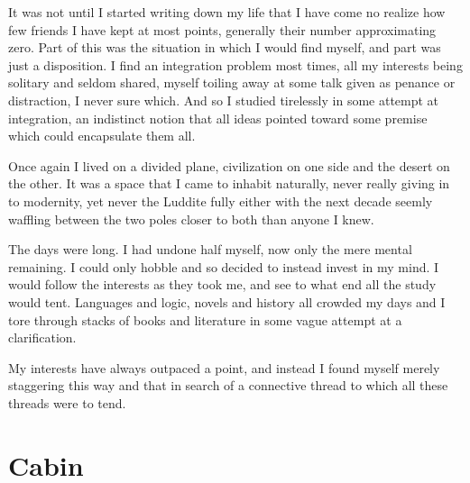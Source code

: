 \documentclass[ebook, 10pt, openright, onecolumn]{memoir}
\begin{document}
It was not until I started writing down my life that I have come no realize how
few friends I have kept at most points, generally their number approximating
zero.  Part of this was the situation in which I would find myself, and part was
just a disposition.  I find an integration problem most times, all my interests
being solitary and seldom shared, myself toiling away at some talk given as
penance or distraction, I never sure which.  And so I studied tirelessly in some
attempt at integration, an indistinct notion that all ideas pointed toward some
premise which could encapsulate them all. 

Once again I lived on a divided plane, civilization on one side and the desert
on the other.  It was a space that I came to inhabit naturally, never really
giving in to modernity, yet never the Luddite fully either with the next decade
seemly waffling between the two poles closer to both than anyone I knew.  

The days were long.  I had undone half myself, now only the mere mental
remaining.  I could only hobble and so decided to instead invest in my mind.  I
would follow the interests as they took me, and see to what end all the study
would tent.  Languages and logic, novels and history all crowded my days and I
tore through stacks of books and literature in some vague attempt at a
clarification.

My interests have always outpaced a point, and instead I found myself merely
staggering this way and that in search of a connective thread to which all these
threads were to tend.

\chapter{Cabin}
\label{cha:cabin}
\end{document}
